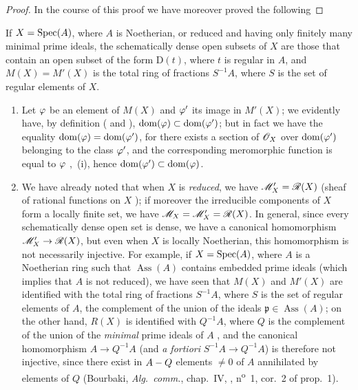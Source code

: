 \begin{proof}
In the course of this proof we have moreover proved the following
\end{proof}

\begin{corollary}[20.2.12]
\label{IV.20.2.12}
If $X=\operatorname{Spec}(A)$, where $A$ is Noetherian, or reduced and having only finitely many minimal prime ideals, the schematically dense open subsets of $X$ are those that contain an open subset of the form $\mathrm{D}(t)$, where $t$ is regular in $A$, and $M(X)=M'(X)$ is the total ring of fractions $S^{-1}A$, where $S$ is the set of regular elements of $X$.
\end{corollary}

\begin{remarks}[20.2.13]\label{IV.20.2.13}
\begin{enumerate}[label=(\roman*)]
  \item Let $\varphi$ be an element of $M(X)$ and $\varphi'$ its image in $M'(X)$; we evidently have, by definition ( and ), $\operatorname{dom}(\varphi)\subset\operatorname{dom}(\varphi')$; but in fact we have the equality $\operatorname{dom}(\varphi)=\operatorname{dom}(\varphi')$, for there exists a section of $\mathscr{O}_X$ over $\operatorname{dom}(\varphi')$ belonging to the class $\varphi'$, and the corresponding meromorphic function is equal to $\varphi$ ,~(i), hence $\operatorname{dom}(\varphi')\subset\operatorname{dom}(\varphi)$.

  \item We have already noted that when $X$ is \emph{reduced}, we have $\mathscr{M}'_X=\mathscr{R}(X)$ (sheaf of rational functions on $X$ ); if moreover the irreducible components of $X$ form a locally finite set, we have $\mathscr{M}_X=\mathscr{M}'_X=\mathscr{R}(X)$.
  In general, since every schematically dense open set is dense, we have a canonical homomorphism $\mathscr{M}'_X\to\mathscr{R}(X)$, but even when $X$ is locally Noetherian, this homomorphism is not necessarily injective.
  For example, if $X=\operatorname{Spec}(A)$, where $A$ is a Noetherian ring such that $\operatorname{Ass}(A)$ contains embedded prime ideals (which implies that $A$ is not reduced), we have seen that $M(X)$ and $M'(X)$ are identified with the total ring of fractions $S^{-1}A$,
  where $S$ is the set of regular elements of $A$, the complement of the union of the ideals $\mathfrak{p}\in\operatorname{Ass}(A)$; on the other hand, $R(X)$ is identified with $Q^{-1}A$, where $Q$ is the complement of the union of the \emph{minimal} prime ideals of $A$ , and the canonical homomorphism $A\to Q^{-1}A$ (and \emph{a fortiori} $S^{-1}A\to Q^{-1}A$) is therefore not injective, since there exist in $A- Q$ elements $\neq0$ of $A$ annihilated by elements of $Q$ (Bourbaki, \emph{Alg.~comm.}, chap.~IV, , n\textsuperscript{o}~1, cor.~2 of prop.~1).


\end{enumerate}
\end{remarks}
